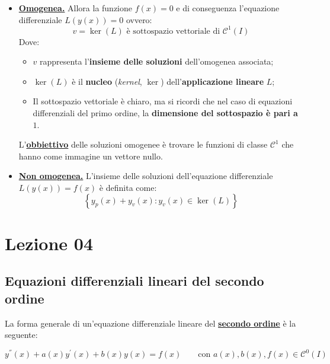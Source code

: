 \documentclass[a4paper]{article}
\begin{document}
	\begin{itemize}[label=]
		\item \textcolor{Red3}{\textbf{\underline{Omogenea.}}} Allora la funzione $f\left(x\right) = 0$ e di conseguenza l'equazione differenziale $L\left(y\left(x\right)\right) = 0$ ovvero:
		\begin{equation*}
			v = \ker\left(L\right) \text{ è sottospazio vettoriale di } \mathcal{C}^{1}\left(I\right)
		\end{equation*}
		Dove:
		\begin{itemize}[label=-]
			\item $v$ rappresenta l'\textbf{insieme delle soluzioni} dell'omogenea associata;			
			\item $\ker\left(L\right)$ è il \textbf{nucleo} (\emph{kernel}, $\ker$) dell'\textbf{applicazione lineare} $L$;
			\item Il sottospazio vettoriale è chiaro, ma si ricordi che nel caso di equazioni differenziali del primo ordine, la \textbf{dimensione del sottospazio è pari a} $1$.
		\end{itemize}
		L'\textbf{\underline{obbiettivo}} delle soluzioni omogenee è trovare le funzioni di classe $\mathcal{C}^{1}$ che hanno come immagine un vettore nullo.
		
		\item \textcolor{Red3}{\textbf{\underline{Non omogenea.}}} L'insieme delle soluzioni dell'equazione differenziale $L\left(y\left(x\right)\right) = f\left(x\right)$ è definita come:
		\begin{equation*}
			\left\{y_{p}\left(x\right) + y_{v}\left(x\right) : y_{v}\left(x\right) \in \ker\left(L\right)\right\}
		\end{equation*}
	\end{itemize}

	\newpage

	\section{Lezione 04}
	
	\subsection{Equazioni differenziali lineari del secondo ordine}
	
	La forma generale di un'equazione differenziale lineare del \textbf{\underline{secondo ordine}} è la seguente:
	
	\begin{equation*}
		y^{''}\left(x\right) + a\left(x\right)y^{'}\left(x\right) + b\left(x\right)y\left(x\right) = f\left(x\right) \hspace{2em} \text{con } a\left(x\right), b\left(x\right), f\left(x\right) \in \mathcal{C}^{0}\left(I\right)
	\end{equation*}
\end{document}
